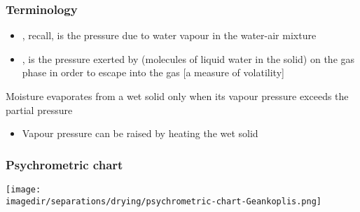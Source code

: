 \begin{frame}\frametitle{Terminology}
	\begin{itemize}	
		\item	{\color{purple}{Partial pressure}}, recall, is the pressure due to water vapour in the water-air mixture
		\item	{\color{purple}{Vapour pressure}}, is the pressure exerted by (molecules of liquid water in the solid) on the gas phase in order to escape into the gas [a measure of volatility]
	\end{itemize}
	\begin{exampleblock}{}
		Moisture evaporates from a wet solid only when its vapour pressure exceeds the partial pressure
	\end{exampleblock}
	\begin{itemize}
		\item	Vapour pressure can be raised by heating the wet solid
	\end{itemize}
\end{frame}


\begin{frame}\frametitle{Psychrometric chart}
	\vfill
	\begin{center}
		\texttt{[image: \\imagedir/separations/drying/psychrometric-chart-Geankoplis.png]}
	\end{center}
\end{frame}

